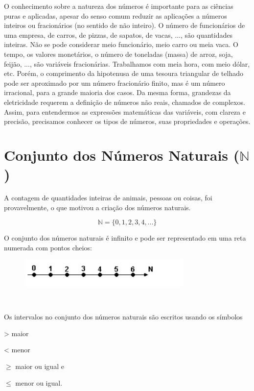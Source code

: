 O conhecimento sobre a natureza dos números é importante para as ciências puras e aplicadas, apesar do senso comum reduzir as aplicações a números inteiros ou fracionários (no sentido de não inteiro). O número de funcionários de uma empresa, de carros, de pizzas, de sapatos, de vacas, ..., são quantidades inteiras. Não se pode considerar meio funcionário, meio carro ou meia vaca. O tempo, os valores monetários, o número de toneladas (massa) de arroz, soja, feijão, ..., são variáveis fracionárias. Trabalhamos com meia hora, com meio dólar, etc. Porém, o comprimento da hipotenusa de uma tesoura triangular de telhado pode ser aproximado por um número fracionário finito, mas é um número irracional, para a grande maioria dos casos. Da mesma forma, grandezas da eletricidade requerem a definição de números não reais, chamados de complexos. Assim, para entendermos as expressões matemáticas das variáveis, com clareza e precisão, precisamos conhecer os tipos de números, suas propriedades e operações.

\section{Conjunto dos Números Naturais ($\mathbb{N}$)}

A contagem de quantidades inteiras de animais, pessoas ou coisas, foi provavelmente, o que motivou a criação dos números naturais.

$$ \mathbb{N} = \{ 0,1,2,3,4,... \}$$

O conjunto dos números naturais é infinito e pode ser representado em uma reta numerada com pontos cheios:

\begin{figure}[H]
	\begin{Center}
		\includegraphics[width=3.44in,height=0.58in]{capitulos/conjuntos_numericos/media/image2.pdf}
	\end{Center}
\end{figure}

~~

Os intervalos no conjunto dos números naturais são escritos usando os símbolos 

> maior 

< menor 

$\geq$ maior ou igual e

$\leq$ menor ou igual.

